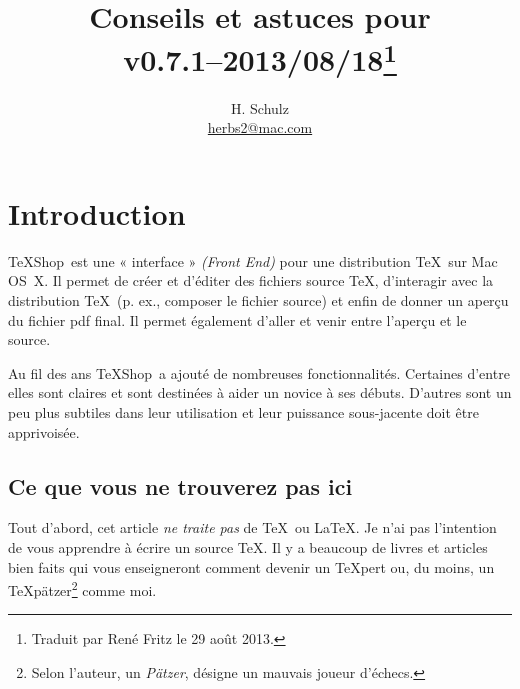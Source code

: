 \documentclass[11pt,french]{article}
\title{Conseils et astuces pour \TS\\\small v0.7.1--2013/08/18\thanks{Traduit par René Fritz le 29 août 2013.}}
\author{H. Schulz\\\small\href{mailto:herbs2@mac.com}{herbs2@mac.com}}
\date{}
\newcommand{\TS}{\textsf{\TeX Shop}}
\newcommand{\acr}[1]{\textsf{#1}}
\begin{document}
\maketitle

\tableofcontents

\newpage

\section{Introduction}

\TS\ est une « interface » \emph{(Front End)} pour une distribution \TeX\ sur Mac OS~X. Il permet de créer et d'éditer des fichiers source \TeX{}, d'interagir avec la distribution \TeX\ (p. ex., composer le fichier source) et enfin de donner un aperçu du fichier \acr{pdf} final. Il permet également d'aller et venir entre l'aperçu et le source.


Au fil des ans \TS\ a ajouté de nombreuses fonctionnalités. Certaines d'entre elles sont claires et sont destinées à aider un novice à ses débuts. D'autres sont un peu plus subtiles dans leur utilisation et leur puissance sous-jacente doit être apprivoisée.


\subsection{Ce que vous ne trouverez pas ici}

Tout d'abord, cet article \emph{ne traite pas} de \TeX\ ou \LaTeX. Je n'ai pas l'intention de vous apprendre à écrire un source \TeX{}. Il y a beaucoup de livres et articles bien faits qui vous enseigneront comment devenir un \TeX pert ou, du moins, un \TeX pätzer\footnote{Selon l'auteur, un \emph{Pätzer}, désigne un mauvais joueur d'échecs.} comme moi.
 
\end{document}
